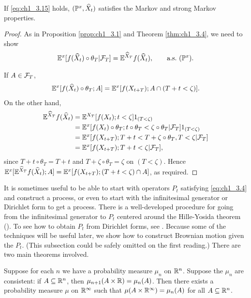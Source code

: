 \begin{proposition}\label{prop:ch1_3.9}
If \eqref{eq:ch1_3.15} holds, $(\P^x, \widehat{X}_t)$ satisfies the Markov and strong Markov properties.
\end{proposition}

\begin{proof}
As in Proposition \ref{prop:ch1_3.1} and Theorem \ref{thm:ch1_3.4}, we need to show
\[
    \E^x[f(\widehat{X}_t) \circ \theta_T\mid \FC_T] = \E^{\widehat{X}_T}f(\widehat{X}_t), \qquad \text{a.s.}~(\P^x).
\]

If $A \in \FC_T$,
\[
    \E^x[f(\widehat{X}_t) \circ \theta_T;A] = \E^x[f(X_{t+T});A \cap (T + t < \zeta)].
\]
On the other hand,
\mpagebreak
\begin{align*}
    \E^{\widehat{X}_T}f(\widehat{X}_t) &= \E^{X_T}[f(X_t);t < \zeta]1_{(T<\zeta)} \\
    &= \E^x[f(X_t) \circ \theta_T;t \circ \theta_T < \zeta \circ \theta_T\mid \FC_T]1_{(T<\zeta)} \\
    &= \E^x[f(X_{t+T});T + t < T + \zeta \circ \theta_T,T < \zeta\mid \FC_T] \\
    &= \E^x[f(X_{t+T});T + t < \zeta\mid \FC_T],
\end{align*}
since $T + t \circ \theta_T = T + t$ and $T + \zeta \circ \theta_T = \zeta$ on $(T < \zeta)$. Hence $\E^x[\E^{\widehat{X}_T}f(\widehat{X}_t);A] = \E^x[f(X_{t+T});(T + t < \zeta) \cap A]$, as required.
\end{proof}


It is sometimes useful to be able to start with operators $P_t$ satisfying \eqref{eq:ch1_3.4} and construct a process, or even to start with the infinitesimal generator or Dirichlet form to get a process. There is a well-developed procedure for going from the infinitesimal generator to $P_t$ centered around the Hille-Yosida theorem  (\cite[see][]{Loeve1977}). To see how to obtain $P_t$ from Dirichlet forms, see \cite{Fukushima1980}. Because some of the techniques will be useful later, we show how to construct Brownian motion given the $P_t$. (This subsection could be safely omitted on the first reading.) There are two main theorems involved.


\begin{theorem}\label{thm:ch1_3.10}
Suppose for each $n$ we have a probability measure $\mu_n$ on $\R^n$. Suppose the $\mu_n$ are consistent: if $A \subseteq \R^n$, then $\mu_{n+1}(A \times \R) = \mu_n(A)$. Then there exists a probability measure $\mu$ on $\R^\infty$ such that $\mu(A \times \R^\infty) = \mu_n(A)$ for all $A \subseteq \R^n$.
\end{theorem}

